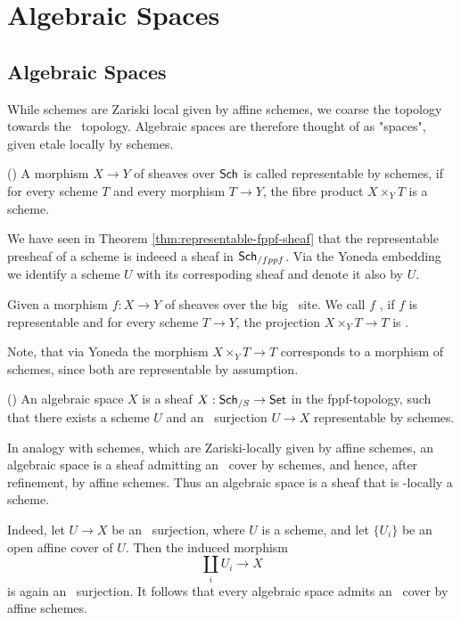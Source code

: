 \chapter{Algebraic Spaces}

\section{Algebraic Spaces}

While schemes are Zariski local given by affine schemes, we coarse the topology towards the \etale\ topology. Algebraic spaces are therefore thought of as "spaces", given etale locally by schemes.

\begin{definition}
	(\cite[][(Definition 4.1.1), p.~105]{alper2026stacks})
	A morphism $X\to Y$ of sheaves over $\mathsf{Sch}$ is called representable by schemes, if for every scheme $T$ and every morphism $T\to Y$, the fibre product $X\times_Y T$ is a scheme.
\end{definition}

We have seen in Theorem \ref{thm:representable-fppf-sheaf} that the representable presheaf of a scheme is indeeed a sheaf in $\mathsf{Sch}_{/fppf}$. Via the Yoneda embedding we identify a scheme $U$ with its correspoding sheaf and denote it also by $U$. 

\begin{definition}
	\label{def:etale-morphisms-of-spaces}
	Given a morphism $f:X\to Y$ of sheaves over the big \etale\ site. We call $f$ \etale, if $f$ is representable and for every scheme $T\to Y$, the projection $X\times_YT\to T$ is \etale.
\end{definition}

\begin{remark}
	Note, that via Yoneda the morphism $X\times_Y T \to T$ corresponds to a morphism of schemes, since both are representable by assumption.
\end{remark}

\begin{definition}
	(\cite[][(Definition 4.1.2), p.~105]{alper2026stacks})
	An algebraic space $X$ is a sheaf $X:\mathsf{Sch}_{/S} \to \mathsf{Set}$ in the fppf-topology, such that there exists a scheme $U$ and an \etale\ surjection $U\to X$ representable by schemes.
\end{definition}

\begin{remark}
	In analogy with schemes, which are Zariski-locally given by affine schemes, an algebraic space is a sheaf admitting an \etale\ cover by schemes, and hence, after refinement, by affine schemes. Thus an algebraic space is a sheaf that is \etale-locally a scheme.
	
	Indeed, let $U \to X$ be an \etale\ surjection, where $U$ is a scheme, and let $\{U_i\}$ be an open affine cover of $U$. Then the induced morphism
	\[
	\coprod_i U_i \to X
	\]
	is again an \etale\ surjection. It follows that every algebraic space admits an \etale\ cover by affine schemes.
\end{remark}

